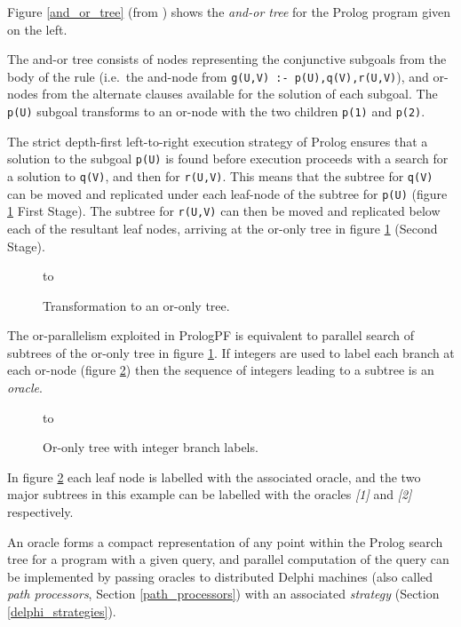 Figure \ref{and_or_tree} (from \cite{CA87}) shows the \textit{and-or tree} for
the Prolog program given on the left.

The and-or tree consists of nodes representing the conjunctive subgoals from
the body of the rule (i.e.\ the and-node from \texttt{g(U,V) :- p(U),q(V),r(U,V)}),
and or-nodes from the alternate clauses available for the solution of each
subgoal.  The \texttt{p(U)} subgoal transforms to an or-node with the two
children \texttt{p(1)} and \texttt{p(2)}.

The strict depth-first left-to-right execution strategy of Prolog ensures that
a solution to the subgoal \texttt{p(U)} is found before execution proceeds with
a search for a solution to \texttt{q(V)}, and then for \texttt{r(U,V)}.
This means that the subtree for \texttt{q(V)} can be moved and replicated under
each leaf-node of the subtree for \texttt{p(U)}
(figure \ref{or_only_tree} First Stage).
 The subtree for \texttt{r(U,V)}
can then be moved and replicated below each of the resultant leaf nodes, arriving
at the or-only tree in figure \ref{or_only_tree} (Second Stage).

\begin{figure}[htb]
\vspace{5mm} \hbox to 
\caption{Transformation to an or-only tree.}
\vspace{5mm}
\label{or_only_tree}
\end{figure}

The or-parallelism exploited in PrologPF is equivalent to parallel search
of subtrees of the or-only tree in figure \ref{or_only_tree}.  If integers are
used to label each branch at each or-node (figure \ref{oracle_tree}) then the
sequence of integers leading to a subtree is an \textit{oracle}.

\begin{figure}[htb]
\vspace{5mm} \hbox to 
\caption{Or-only tree with integer branch labels.}
\vspace{5mm}
\label{oracle_tree}
\end{figure}

In figure \ref{oracle_tree} each leaf node is labelled with the associated oracle,
and the two major subtrees in this example can be labelled with the oracles
\textit{[1]} and \textit{[2]} respectively.

An oracle forms a compact representation of any point within the Prolog
search tree for a program with a given query, and parallel computation of the
query can be implemented by passing oracles to distributed Delphi machines
(also called \textit{path processors}, Section \ref{path_processors})
with an associated \textit{strategy} (Section \ref{delphi_strategies}).

